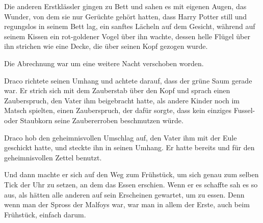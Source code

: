 Die anderen Erstklässler gingen zu Bett und sahen es mit eigenen Augen, das Wunder, von dem sie nur Gerüchte gehört hatten, dass Harry Potter still und regungslos in seinem Bett lag, ein sanftes Lächeln auf dem Gesicht, während auf seinem Kissen ein rot-goldener Vogel über ihn wachte, dessen helle Flügel über ihn strichen wie eine Decke, die über seinen Kopf gezogen wurde.

Die Abrechnung war um eine weitere Nacht verschoben worden.


Draco richtete seinen Umhang und achtete darauf, dass der grüne Saum gerade war. Er strich sich mit dem Zauberstab über den Kopf und sprach einen Zauberspruch, den Vater ihm beigebracht hatte, als andere Kinder noch im Matsch spielten, einen Zauberspruch, der dafür sorgte, dass kein einziges Fussel- oder Staubkorn seine Zaubererroben beschmutzen würde.

Draco hob den geheimnisvollen Umschlag auf, den Vater ihm mit der Eule geschickt hatte, und steckte ihn in seinen Umhang. Er hatte bereits  und  für den geheimnisvollen Zettel benutzt.

Und dann machte er sich auf den Weg zum Frühstück, um sich genau zum selben Tick der Uhr zu setzen, an dem das Essen erschien. Wenn er es schaffte sah es so aus, als hätten alle anderen auf sein Erscheinen gewartet, um zu essen. Denn wenn man der Spross der Malfoys war, war man in allem der Erste, auch beim Frühstück, einfach darum.

